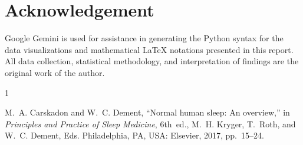 \documentclass[conference]{IEEEtran}
\begin{document}
\section*{Acknowledgement}
Google Gemini is used for assistance in generating the Python syntax for the data visualizations and mathematical LaTeX notations presented in this report. All data collection, statistical methodology, and interpretation of findings are the original work of the author.

\begin{thebibliography}{1}

M.~A. Carskadon and W.~C. Dement,
``Normal human sleep: An overview,''
in \emph{Principles and Practice of Sleep Medicine},
6th~ed., M.~H. Kryger, T.~Roth, and W.~C. Dement, Eds.
Philadelphia, PA, USA: Elsevier, 2017, pp.~15--24.

\end{thebibliography}

% 
\end{document}
